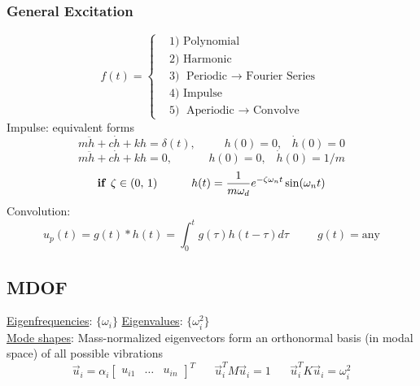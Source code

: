 \documentclass[twocolumn, 12pt]{article}    %
\begin{document}
\subsubsection*{General Excitation}
\[
f(t) = \begin{cases}
    &1)\text{   Polynomial}\\
    &2)\text{   Harmonic}\\
    &3)\text{   Periodic \(\rightarrow\) Fourier Series}\\
    &4)\text{   Impulse}\\
    &5)\text{   Aperiodic \(\rightarrow\) Convolve}
\end{cases}
\]
Impulse: \hspace{120pt} equivalent forms
\begin{equation*}
    m\ddot{h} +c\dot{h}+kh = \delta(t), \hspace{30pt} h(0)=0, \hspace{10pt}  \dot{h}(0)=0
\end{equation*}
\begin{equation*}
    m\ddot{h} +c\dot{h}+kh = 0, \hspace{38pt} h(0)=0, \hspace{10pt} \dot{h}(0)=1/m
\end{equation*}
\begin{equation*}
    \text{\textbf{if   }} \zeta \in (0,\,1) \hspace{30pt} h(t) = \frac{1}{m\omega_d}e^{-\zeta \omega_n t}\sin(\omega_n t)
\end{equation*}
Convolution:
\begin{equation*}
    u_p(t) = g(t) \ast h(t) = \int_0^tg(\tau) h(t-\tau)d\tau \hspace{30pt} g(t) = \text{any}
\end{equation*}


\subsection*{MDOF}
\noindent \underline{Eigenfrequencies}: \(\{\omega_i\}\) \hspace{30pt} \underline{Eigenvalues}: \(\{\omega_i^2\}\)\\
\underline{Mode shapes}: Mass-normalized eigenvectors form an orthonormal basis (in modal space) of all possible vibrations
\begin{equation*}
    \vec{u}_i = \alpha_i \begin{bmatrix}
        u_{i1} & \dots & u_{in}
    \end{bmatrix}^T \hspace{20pt} \vec{u}_i^T M \vec{u}_i = 1 \hspace{20pt} \vec{u}_i^T K \vec{u}_i = \omega_i^2
\end{equation*}
\end{document}
